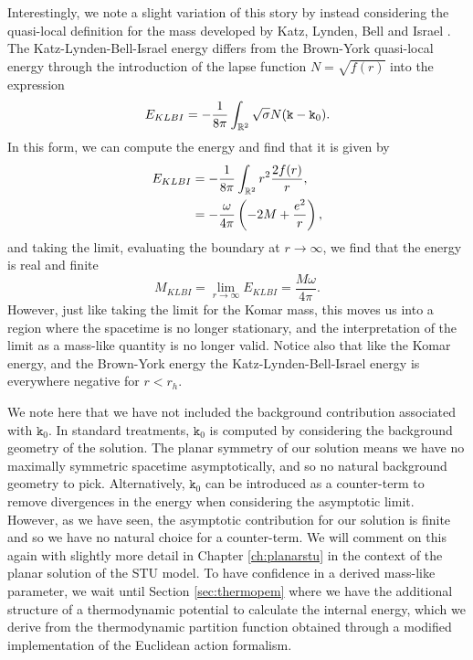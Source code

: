 Interestingly, we note a slight variation of this story by instead considering the quasi-local definition for the mass developed by Katz, Lynden, Bell and Israel \cite{Katz_1988}. The Katz-Lynden-Bell-Israel energy differs from the Brown-York quasi-local energy through the introduction of the lapse function $N = \sqrt{f(r)}$ into the expression
\begin{equation*}
E_{KLBI} = -\frac{1}{8 \pi} \int_{{\mathbb{R}}^2} \sqrt{\sigma} N (\mathtt{k} - \mathtt{k}_0).
\end{equation*}
In this form, we can compute the energy and find that it is given by
\begin{equation*}
\begin{aligned}
	E_{KLBI} &= -\frac{1}{8 \pi} \int_{{\mathbb{R}}^2} r^2 \frac{2f(r)}{r}, \\
	&= - \frac{\omega}{4 \pi} \left( -2M + \frac{e^2}{r} \right),
\end{aligned}
\end{equation*}
and taking the limit, evaluating the boundary at $r \rightarrow \infty$, we find that the energy is real and finite
\begin{equation*}
	M_{KLBI} = \lim_{r \rightarrow \infty} E_{KLBI} = \frac{M \omega}{4 \pi}.
\end{equation*}
However, just like taking the limit for the Komar mass, this moves us into a region where the spacetime is no longer stationary, and the interpretation of the limit as a mass-like quantity is no longer valid. Notice also that like the Komar energy, and the Brown-York energy the Katz-Lynden-Bell-Israel energy is everywhere negative for $r < r_h$.

We note here that we have not included the background contribution associated with $\mathtt{k}_0$. In standard treatments, $\mathtt{k}_0$ is computed by considering the background geometry of the solution. The planar symmetry of our solution means we have no maximally symmetric spacetime asymptotically, and so no natural background geometry to pick. Alternatively, $\mathtt{k}_0$ can be introduced as a counter-term to remove divergences in the energy when considering the asymptotic limit. However, as we have seen, the asymptotic contribution for our solution is finite and so we have no natural choice for a counter-term. We will comment on this again with slightly more detail in Chapter \ref{ch:planarstu} in the context of the planar solution of the STU model. To have confidence in a derived mass-like parameter, we wait until Section \ref{sec:thermopem} where we have the additional structure of a thermodynamic potential to calculate the internal energy, which we derive from the thermodynamic partition function obtained through a modified implementation of the Euclidean action formalism.
 
